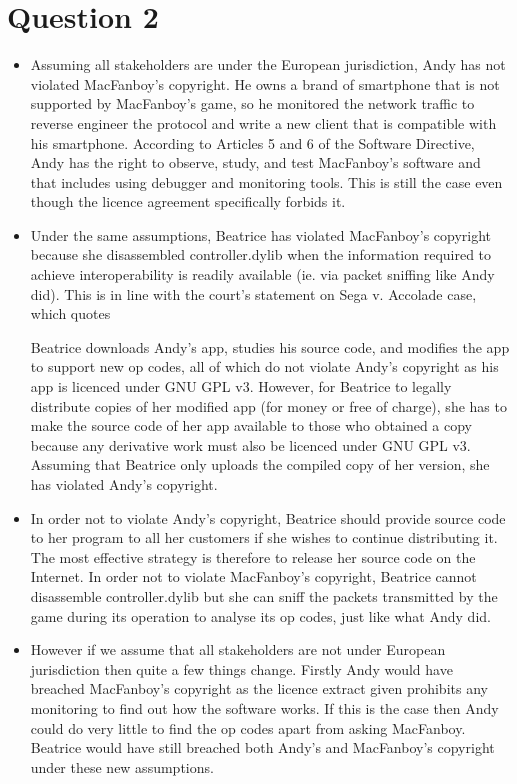 \documentclass[10pt,a4paper]{article}
\begin{document}
\section*{Question 2}
\begin{itemize}
\item Assuming all stakeholders are under the European jurisdiction, Andy has not violated MacFanboy's copyright. He owns a brand of smartphone that is not supported by MacFanboy's game, so he monitored the network traffic to reverse engineer the protocol and write a new client that is compatible with his smartphone. According to Articles 5 and 6 of the Software Directive, Andy has the right to observe, study, and test MacFanboy's software and that includes using debugger and monitoring tools. This is still the case even though the licence agreement specifically forbids it.
\item Under the same assumptions, Beatrice has violated MacFanboy's copyright because she disassembled controller.dylib when the information required to achieve interoperability is readily available (ie. via packet sniffing like Andy did). This is in line with the court's statement on Sega v. Accolade case, which quotes

\begin{displayquote}
\end{displayquote}

Beatrice downloads Andy's app, studies his source code, and modifies the app to support new op codes, all of which do not violate Andy's copyright as his app is licenced under GNU GPL v3. However, for Beatrice to legally distribute copies of her modified app (for money or free of charge), she has to make the source code of her app available to those who obtained a copy because any derivative work must also be licenced under GNU GPL v3. Assuming that Beatrice only uploads the compiled copy of her version, she has violated Andy's copyright.
\item In order not to violate Andy's copyright, Beatrice should provide source code to her program to all her customers if she wishes to continue distributing it. The most effective strategy is therefore to release her source code on the Internet. In order not to violate MacFanboy's copyright, Beatrice cannot disassemble controller.dylib but she can sniff the packets transmitted by the game during its operation to analyse its op codes, just like what Andy did.
\item However if we assume that all stakeholders are not under European jurisdiction then quite a few things change. Firstly Andy would have breached MacFanboy's copyright as the licence extract given prohibits any monitoring to find out how the software works. If this is the case then Andy could do very little to find the op codes apart from asking MacFanboy. Beatrice would have still breached both Andy's and MacFanboy's copyright under these new assumptions.
\end{itemize}
\end{document}
